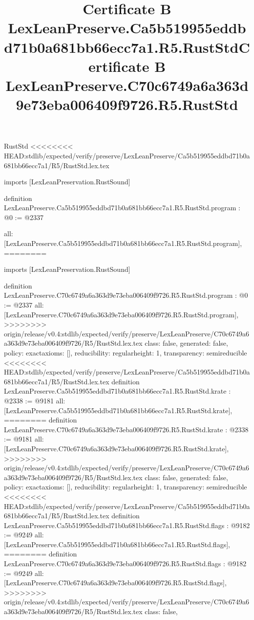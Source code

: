 \begin{lexlean}{RustStd}
<<<<<<<< HEAD:stdlib/expected/verify/preserve/LexLeanPreserve/Ca5b519955eddbd71b0a681bb66ecc7a1/R5/RustStd.lex.tex
\title{Certificate B LexLeanPreserve.Ca5b519955eddbd71b0a681bb66ecc7a1.R5.RustStd}
\begin{coremodule}
imports [LexLeanPreservation.RustSound]

definition LexLeanPreserve.Ca5b519955eddbd71b0a681bb66ecc7a1.R5.RustStd.program : @0 := @2337 {
  all: [LexLeanPreserve.Ca5b519955eddbd71b0a681bb66ecc7a1.R5.RustStd.program],
========
\title{Certificate B LexLeanPreserve.C70c6749a6a363d9e73eba006409f9726.R5.RustStd}
\begin{coremodule}
imports [LexLeanPreservation.RustSound]

definition LexLeanPreserve.C70c6749a6a363d9e73eba006409f9726.R5.RustStd.program : @0 := @2337 {
  all: [LexLeanPreserve.C70c6749a6a363d9e73eba006409f9726.R5.RustStd.program],
>>>>>>>> origin/release/v0.4:stdlib/expected/verify/preserve/LexLeanPreserve/C70c6749a6a363d9e73eba006409f9726/R5/RustStd.lex.tex
  class: false,
  generated: false,
  policy: exact{axioms: []},
  reducibility: regular{height: 1},
  transparency: semireducible
}
<<<<<<<< HEAD:stdlib/expected/verify/preserve/LexLeanPreserve/Ca5b519955eddbd71b0a681bb66ecc7a1/R5/RustStd.lex.tex
definition LexLeanPreserve.Ca5b519955eddbd71b0a681bb66ecc7a1.R5.RustStd.krate : @2338 := @9181 {
  all: [LexLeanPreserve.Ca5b519955eddbd71b0a681bb66ecc7a1.R5.RustStd.krate],
========
definition LexLeanPreserve.C70c6749a6a363d9e73eba006409f9726.R5.RustStd.krate : @2338 := @9181 {
  all: [LexLeanPreserve.C70c6749a6a363d9e73eba006409f9726.R5.RustStd.krate],
>>>>>>>> origin/release/v0.4:stdlib/expected/verify/preserve/LexLeanPreserve/C70c6749a6a363d9e73eba006409f9726/R5/RustStd.lex.tex
  class: false,
  generated: false,
  policy: exact{axioms: []},
  reducibility: regular{height: 1},
  transparency: semireducible
}
<<<<<<<< HEAD:stdlib/expected/verify/preserve/LexLeanPreserve/Ca5b519955eddbd71b0a681bb66ecc7a1/R5/RustStd.lex.tex
definition LexLeanPreserve.Ca5b519955eddbd71b0a681bb66ecc7a1.R5.RustStd.flags : @9182 := @9249 {
  all: [LexLeanPreserve.Ca5b519955eddbd71b0a681bb66ecc7a1.R5.RustStd.flags],
========
definition LexLeanPreserve.C70c6749a6a363d9e73eba006409f9726.R5.RustStd.flags : @9182 := @9249 {
  all: [LexLeanPreserve.C70c6749a6a363d9e73eba006409f9726.R5.RustStd.flags],
>>>>>>>> origin/release/v0.4:stdlib/expected/verify/preserve/LexLeanPreserve/C70c6749a6a363d9e73eba006409f9726/R5/RustStd.lex.tex
  class: false,
}}}
\end{coremodule}}
\end{coremodule}
\end{lexlean}
